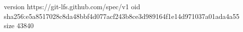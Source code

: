 version https://git-lfs.github.com/spec/v1
oid sha256:e5a8517028c8da48bbf4d077acf243b8ce3d989164f1e14d971037a01ada4a55
size 43840
